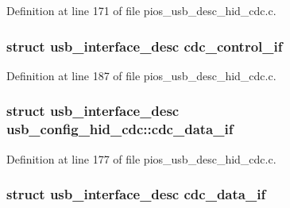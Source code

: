 \-Definition at line 171 of file pios\-\_\-usb\-\_\-desc\-\_\-hid\-\_\-cdc.\-c.

\hypertarget{group___p_i_o_s___u_s_b___d_e_s_c_ga9ca646cc7183c87c14d220ac2ccaba38}{
\subsubsection[{cdc\-\_\-control\-\_\-if}]{\setlength{\rightskip}{0pt plus 5cm}struct {\bf usb\-\_\-interface\-\_\-desc} {\bf cdc\-\_\-control\-\_\-if}}}\label{group___p_i_o_s___u_s_b___d_e_s_c_ga9ca646cc7183c87c14d220ac2ccaba38}


\-Definition at line 187 of file pios\-\_\-usb\-\_\-desc\-\_\-hid\-\_\-cdc.\-c.

\hypertarget{group___p_i_o_s___u_s_b___d_e_s_c_ga80b1d19d38b5379618c5e66f0da9dcb2}{
\subsubsection[{cdc\-\_\-data\-\_\-if}]{\setlength{\rightskip}{0pt plus 5cm}struct {\bf usb\-\_\-interface\-\_\-desc} {\bf usb\-\_\-config\-\_\-hid\-\_\-cdc\-::cdc\-\_\-data\-\_\-if}}}\label{group___p_i_o_s___u_s_b___d_e_s_c_ga80b1d19d38b5379618c5e66f0da9dcb2}


\-Definition at line 177 of file pios\-\_\-usb\-\_\-desc\-\_\-hid\-\_\-cdc.\-c.

\hypertarget{group___p_i_o_s___u_s_b___d_e_s_c_gab685a3142df1c86fb19d69d84a296989}{
\subsubsection[{cdc\-\_\-data\-\_\-if}]{\setlength{\rightskip}{0pt plus 5cm}struct {\bf usb\-\_\-interface\-\_\-desc} {\bf cdc\-\_\-data\-\_\-if}}}\label{group___p_i_o_s___u_s_b___d_e_s_c_gab685a3142df1c86fb19d69d84a296989}


